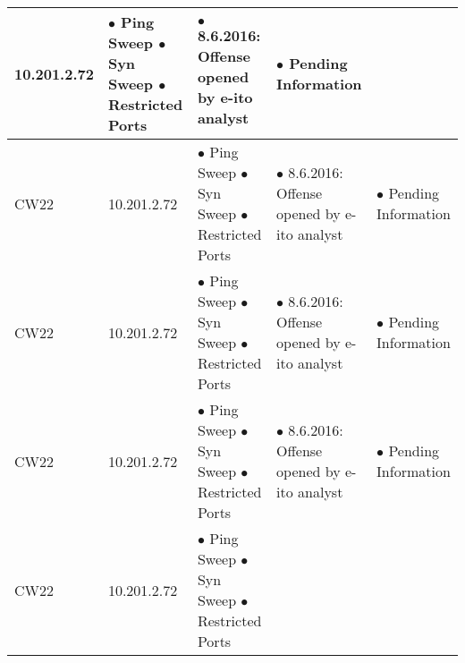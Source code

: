\begin{center}
\begin{longtable}{|p{2cm}|p{}|p{4cm}|p{6cm}|p{4cm}|}
10.201.2.72 & %

$\bullet$ Ping Sweep \newline %
$\bullet$ Syn Sweep \newline
$\bullet$ Restricted Ports &

$\bullet$ 8.6.2016: Offense opened by e-ito analyst & %

$\bullet$ Pending Information %
\\
\hline %
CW22 & %

10.201.2.72 & %

$\bullet$ Ping Sweep \newline %
$\bullet$ Syn Sweep \newline
$\bullet$ Restricted Ports &

$\bullet$ 8.6.2016: Offense opened by e-ito analyst & %

$\bullet$ Pending Information %
\\
\hline %
CW22 & %

10.201.2.72 & %

$\bullet$ Ping Sweep \newline %
$\bullet$ Syn Sweep \newline
$\bullet$ Restricted Ports &

$\bullet$ 8.6.2016: Offense opened by e-ito analyst & %

$\bullet$ Pending Information %
\\
\hline %
CW22 & %

10.201.2.72 & %

$\bullet$ Ping Sweep \newline %
$\bullet$ Syn Sweep \newline
$\bullet$ Restricted Ports &

$\bullet$ 8.6.2016: Offense opened by e-ito analyst & %

$\bullet$ Pending Information %
\\
\hline %
CW22 & %

10.201.2.72 & %

$\bullet$ Ping Sweep \newline %
$\bullet$ Syn Sweep \newline
$\bullet$ Restricted Ports &


\end{longtable}
\end{center}
